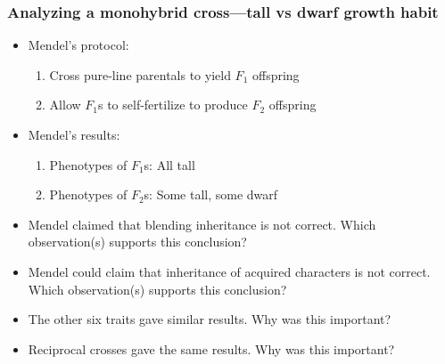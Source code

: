 \begin{frame}[t]
    \frametitle{Analyzing a monohybrid cross---tall vs dwarf growth habit}

    \begin{itemize}
        \item<1-> Mendel's  protocol:
            \begin{enumerate}
                \item<1-> Cross pure-line parentals to yield $F_1$ offspring
                \item<1-> Allow $F_1$s to self-fertilize to produce $F_2$ offspring
            \end{enumerate}

        \item<2-> Mendel's results:
            \begin{enumerate}
                \item<2-> Phenotypes of $F_1$s: All tall
                \item<2-> Phenotypes of $F_2$s: Some tall, some dwarf
            \end{enumerate}
    \end{itemize}

\end{frame}

\begin{frame}
    \begin{itemize}
        \item Mendel claimed that blending inheritance is not correct. Which
            observation(s) supports this conclusion?

        \item Mendel could claim that inheritance of acquired characters is not
            correct. Which observation(s) supports this conclusion?

        \item The other six traits gave similar results. Why was this
            important?

        \item Reciprocal crosses gave the same results. Why was this important?
    \end{itemize}
\end{frame}

